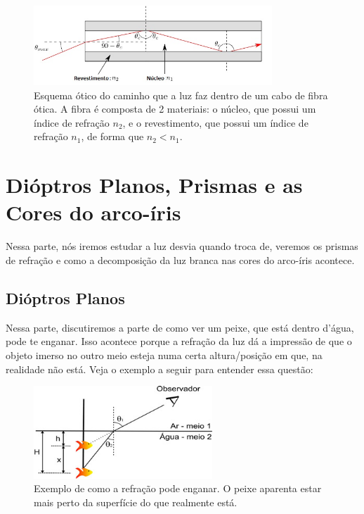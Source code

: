 \documentclass[12pt]{extarticle}
\newcommand{\<}{\langle}
\renewcommand{\>}{\rangle}
\theoremstyle{definition}
\begin{document}
\begin{figure}[H]
    \centering
    \includegraphics[width=0.8\textwidth]{fibra_otica.jpg}
    \caption{Esquema ótico do caminho que a luz faz dentro de um cabo de fibra ótica. A fibra é composta de 2 materiais: o núcleo, que possui um índice de refração $n_2$, e o revestimento, que possui um índice de refração $n_1$, de forma que $n_2<n_1$.}
    \label{fig:fibra_otica}
\end{figure}

\section{Dióptros Planos, Prismas e as Cores do arco-íris}
Nessa parte, nós iremos estudar a luz desvia quando troca de, veremos os prismas de refração e como a decomposição da luz branca nas cores do arco-íris acontece.

\subsection{Dióptros Planos}
Nessa parte, discutiremos a parte de como ver um peixe, que está dentro d'água, pode te enganar. Isso acontece porque a refração da luz dá a impressão de que o objeto imerso no outro meio esteja numa certa altura/posição em que, na realidade não está. Veja o exemplo a seguir para entender essa questão:
\begin{figure}[H]
    \centering
    \includegraphics[width=0.6\textwidth]{dioptro2.jpg}
    \caption{Exemplo de como a refração pode enganar. O peixe aparenta estar mais perto da superfície do que realmente está.}
    \label{fig:dioptro}
\end{figure}
\end{document}
